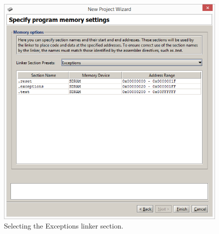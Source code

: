 \documentclass[epsfig,10pt,fullpage]{article}
\begin{document}
~\\
\begin{figure}[H]
	\begin{center}
	\includegraphics[scale=0.58]{figures/exceptions_s.png}
	\end{center}
	\vspace{-0.25cm}\caption{Selecting the {\sf Exceptions} linker section.}
\label{fig:exceptions}
\end{figure}
\newpage
\end{document}
